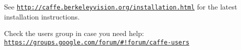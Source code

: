 See \href{http://caffe.berkeleyvision.org/installation.html}{\tt http\+://caffe.\+berkeleyvision.\+org/installation.\+html} for the latest installation instructions.

Check the users group in case you need help\+: \href{https://groups.google.com/forum/#!forum/caffe-users}{\tt https\+://groups.\+google.\+com/forum/\#!forum/caffe-\/users} 